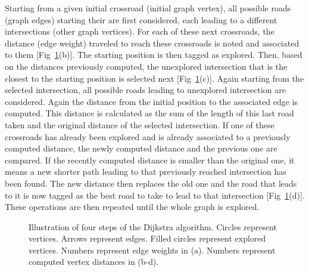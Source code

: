 Starting from a given initial crossroad (initial graph vertex), all possible roads (graph edges) starting their are first considered, each leading to a different intersections (other graph vertices).
For each of these next crossroads, the distance (edge weight) traveled to reach these crossroads is noted and associated to them [Fig~\ref{fig:dijkstra_principle}(b)].
The starting position is then tagged as explored.
Then, based on the distances previously computed, the unexplored intersection that is the closest to the starting position is selected next [Fig~\ref{fig:dijkstra_principle}(c)].
Again starting from the selected intersection, all possible roads leading to unexplored intersection are considered.
Again the distance from the initial position to the associated edge is computed.
This distance is calculated as the sum of the length of this last road taken and the original distance of the selected intersection.
If one of these crossroads has already been explored and is already associated to a previously computed distance, the newly computed distance and the previous one are compared.
If the recently computed distance is smaller than the original one, it means a new shorter path leading to that previously reached intersection has been found.
The new distance then replaces the old one and the road that leads to it is now tagged as the best road to take to lead to that intersection [Fig~\ref{fig:dijkstra_principle}(d)].
These operations are then repeated until the whole graph is explored.
\begin{figure}
	\centering
	\def\svgwidth{\textwidth}
	
  	\caption[Illustration of four steps of the Dijkstra algorithm.]{
  		Illustration of four steps of the Dijkstra algorithm.
  		Circles represent vertices.
  		Arrows represent edges.
  		Filled circles represent explored vertices.
  		Numbers represent edge weights in (a).
  		Numbers represent computed vertex distances in (b-d).
  	}
  	\label{fig:dijkstra_principle}
\end{figure}

